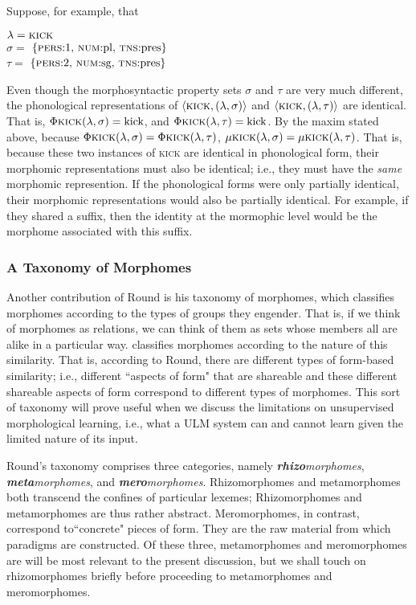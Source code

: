 Suppose, for example, that 
\begin{center}
$\lambda = \textsc{kick}$\\
$\sigma =$ $\{\text{\textsc{pers}:1, \textsc{num}:pl, \textsc{tns}:pres} \}$\\
$\tau =$ $\{\text{\textsc{pers}:2, \textsc{num}:sg, \textsc{tns}:pres}\}$\\
\end{center}
Even though the morphosyntactic property sets $\sigma$ and $\tau$ are very much different,
the phonological representations of $\langle \textsc{kick}, (\lambda,\sigma) \rangle$
and $\langle \textsc{kick}, (\lambda,\tau) \rangle$ are identical. That is,
$\Phi{\textsc{kick}}(\lambda,\sigma) = \text{kick}$, and 
$\Phi{\textsc{kick}}(\lambda,\tau) = \text{kick}$. By the maxim stated above, because 
$\Phi{\textsc{kick}}(\lambda,\sigma) =  \Phi{\textsc{kick}}(\lambda,\tau)$, 
$\mu{\textsc{kick}}(\lambda,\sigma) = \mu{\textsc{kick}}(\lambda,\tau)$.
That is, because these two instances of \textsc{kick} are identical in 
phonological form, their morphomic representations must also be identical; 
i.e., they must have the \emph{same} morphomic represention. If the 
phonological forms were only partially identical, their morphomic 
representations would also be partially identical. For example, if they 
shared a suffix, then the identity at the mormophic level would 
be the morphome associated with this suffix.

\subsubsection{A Taxonomy of Morphomes}
Another contribution of Round is his taxonomy of morphomes, which 
classifies morphomes according to the types of groups they engender. 
That is, if we think of morphomes as relations, we can think of them as 
sets whose members all are alike in a particular way. \cite{round:2015, round:md:2016} 
classifies morphomes according to the nature of this similarity. That is, 
according to Round, there are different types of form-based similarity; i.e., different ``aspects of form" that are 
shareable \citep[][p.230]{round:md:2016} and these different shareable aspects of form correspond to different types of morphomes. 
This sort of taxonomy will prove useful when we discuss the 
limitations on unsupervised morphological learning, i.e., what a \ac{ULM} 
system can and cannot learn given the limited nature of its input.

Round's taxonomy comprises three categories, namely 
\textit{\textbf{rhizo}morphomes}, \textit{\textbf{meta}morphomes}, 
and \textit{\textbf{mero}morphomes}. 
Rhizomorphomes and metamorphomes both transcend the confines of 
particular lexemes; Rhizomorphomes and metamorphomes are thus 
rather abstract. Meromorphomes, in contrast, correspond to``concrete" 
pieces of form. They are the raw material from which paradigms are constructed. 
Of these three, metamorphomes and meromorphomes are will be most 
relevant to the present discussion, but we shall touch on rhizomorphomes briefly 
before proceeding to metamorphomes and meromorphomes.


